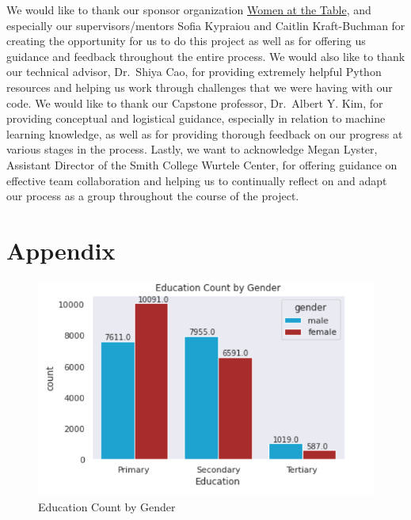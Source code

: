 \documentclass[water,article,submit,moreauthors,pdftex]{mdpi}
\begin{document}
We would like to thank our sponsor organization
\href{https://www.womenatthetable.net/}{Women at the Table}, and
especially our supervisors/mentors Sofia Kypraiou and Caitlin
Kraft-Buchman for creating the opportunity for us to do this project as
well as for offering us guidance and feedback throughout the entire
process. We would also like to thank our technical advisor, Dr.~Shiya
Cao, for providing extremely helpful Python resources and helping us
work through challenges that we were having with our code. We would like
to thank our Capstone professor, Dr.~Albert Y. Kim, for providing
conceptual and logistical guidance, especially in relation to machine
learning knowledge, as well as for providing thorough feedback on our
progress at various stages in the process. Lastly, we want to
acknowledge Megan Lyster, Assistant Director of the Smith College
Wurtele Center, for offering guidance on effective team collaboration
and helping us to continually reflect on and adapt our process as a
group throughout the course of the project.

\hypertarget{appendix}{%
\section{Appendix}\label{appendix}}

\begin{figure}
\centering
\includegraphics[width=\textwidth,height=0.5\textheight]{images/educ_count_gender.png}
\caption{Education Count by Gender}
\end{figure}
\end{document}
